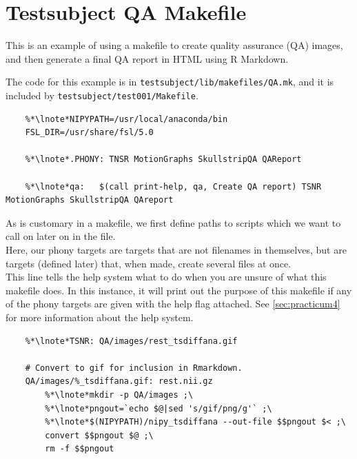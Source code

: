 \section{Testsubject QA Makefile}
\label{example:testsubjectQA}

This is an example of using a makefile to create quality assurance (QA) images, and then generate a final QA report in HTML using R Markdown. 

The code for this example is in \texttt{testsubject/lib/makefiles/QA.mk}, and it is included by \texttt{testsubject/test001/Makefile}.

\setcounter{codehighlight}{0} %
\begin{lstlisting}
	%*\lnote*NIPYPATH=/usr/local/anaconda/bin
	FSL_DIR=/usr/share/fsl/5.0

	%*\lnote*.PHONY: TNSR MotionGraphs SkullstripQA QAReport

	%*\lnote*qa:   $(call print-help, qa, Create QA report) TSNR MotionGraphs SkullstripQA QAreport
\end{lstlisting}

\noindent{} As is customary in a makefile, we first define paths to scripts which we want to call on later on in the file. \\
 Here, our phony targets are targets that are not filenames in themselves, but are targets (defined later) that, when made, create several files at once. \\
 This line tells the \maken{} help system what to do when you are unsure of what this makefile does. In this instance, it will print out the purpose of this makefile if any of the phony targets are given with the help flag attached. See \autoref{sec:practicum4} for more information about the help system. \\

\begin{lstlisting}
	%*\lnote*TSNR: QA/images/rest_tsdiffana.gif

	# Convert to gif for inclusion in Rmarkdown. 
	QA/images/%_tsdiffana.gif: rest.nii.gz
		%*\lnote*mkdir -p QA/images ;\
		%*\lnote*pngout=`echo $@|sed 's/gif/png/g'` ;\
		%*\lnote*$(NIPYPATH)/nipy_tsdiffana --out-file $$pngout $< ;\
		convert $$pngout $@ ;\
		rm -f $$pngout
\end{lstlisting}


